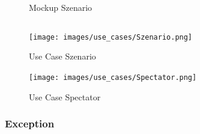 \begin{figure}[h]
	\centering
	\qquad
	\caption{Mockup Szenario}
\end{figure}
\newpage
\begin{verbatim}
\end{verbatim}
\begin{figure}[h]
	\begin{center}
		\texttt{[image: images/use\_cases/Szenario.png]}
	\end{center}
	\caption{Use Case Szenario}
	\label{fig:UC_Szenario_1}
\end{figure}
\begin{figure}[h]
	\begin{center}
		\texttt{[image: images/use\_cases/Spectator.png]}
	\end{center}
	\caption{Use Case Spectator}
	\label{fig:UC_Szenario_2}
\end{figure}

\newpage
\color{process}
\subsubsection{Exception}

